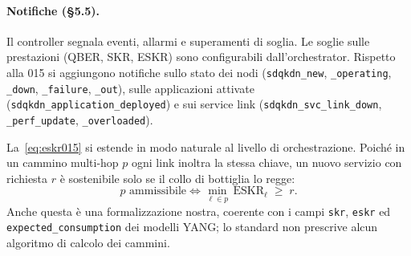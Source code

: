 \paragraph{Notifiche (§5.5).}
Il controller segnala eventi, allarmi e superamenti di soglia. Le soglie
sulle prestazioni (QBER, SKR, ESKR) sono configurabili dall'orchestrator.
Rispetto alla 015 si aggiungono notifiche sullo stato dei nodi
(\texttt{sdqkdn\_new}, \texttt{\_operating}, \texttt{\_down},
\texttt{\_failure}, \texttt{\_out}), sulle applicazioni attivate
(\texttt{sdqkdn\_application\_deployed}) e sui service link
(\texttt{sdqkdn\_svc\_link\_down}, \texttt{\_perf\_update},
\texttt{\_overloaded}).

La~\eqref{eq:eskr015} si estende in modo naturale al livello di
orchestrazione. Poiché in un cammino multi-hop $p$ ogni link inoltra la
stessa chiave, un nuovo servizio con richiesta $r$ è sostenibile solo se il
collo di bottiglia lo regge:
\begin{equation}
  p \text{ ammissibile} \iff
  \min_{\ell\in p}\, \mathrm{ESKR}_\ell \;\ge\; r .
  \label{eq:admissible}
\end{equation}
Anche questa è una formalizzazione nostra, coerente con i campi
\texttt{skr}, \texttt{eskr} ed \texttt{expected\_consumption} dei modelli
YANG; lo standard non prescrive alcun algoritmo di calcolo dei cammini.
